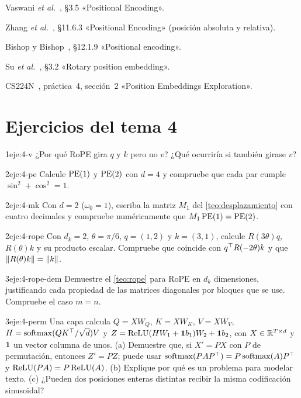 \begin{lecturas}
\item Vaswani \emph{et al.}~\cite{vaswani}, §3.5 «Positional Encoding».
\item Zhang \emph{et al.}~\cite{d2l}, §11.6.3 «Positional Encoding» (posición absoluta y relativa).
\item Bishop y Bishop~\cite{bishopdl}, §12.1.9 «Positional encoding».
\item Su \emph{et al.}~\cite{roformer}, §3.2 «Rotary position embedding».
\item CS224N~\cite{cs224n}, práctica~4, sección~2 «Position Embeddings Exploration».
\end{lecturas}

\section*{Ejercicios del tema 4}

\begin{ejercicio}{1}{eje:4-v}
¿Por qué RoPE gira $q$ y $k$ pero no $v$? ¿Qué ocurriría si también girase $v$?
\end{ejercicio}

\begin{ejercicio}{2}{eje:4-pe}
Calcule $\operatorname{PE}(1)$ y $\operatorname{PE}(2)$ con $d=4$ y compruebe que cada par cumple $\sin^{2}+\cos^{2}=1$.
\end{ejercicio}

\begin{ejercicio}{2}{eje:4-mk}
Con $d=2$ ($\omega_0=1$), escriba la matriz $M_1$ del \cref{teo:desplazamiento} con cuatro decimales y compruebe numéricamente que $M_1\operatorname{PE}(1)=\operatorname{PE}(2)$.
\end{ejercicio}

\begin{ejercicio}{2}{eje:4-rope}
Con $d_k=2$, $\theta=\pi/6$, $q=(1,2)$ y $k=(3,1)$, calcule $R(3\theta)q$, $R(\theta)k$ y su producto escalar. Compruebe que coincide con $q^{\top} R(-2\theta)k$ y que $\lVert R(\theta)k\rVert=\lVert k\rVert$.
\end{ejercicio}

\begin{ejercicio}{3}{eje:4-rope-dem}
Demuestre el \cref{teo:rope} para RoPE en $d_k$ dimensiones, justificando cada propiedad de las matrices diagonales por bloques que se use. Compruebe el caso $m=n$.
\end{ejercicio}

\begin{ejercicio}{3}{eje:4-perm}
Una capa calcula $Q=XW_Q$, $K=XW_K$, $V=XW_V$, $H=\operatorname{softmax}(QK^{\top}/\sqrt d)V$ y $Z=\operatorname{ReLU}(HW_1+\mathbf{1} b_1)W_2+\mathbf{1} b_2$, con $X\in\mathbb{R}^{T\times d}$ y $\mathbf{1}$ un vector columna de unos. (a) Demuestre que, si $X'=PX$ con $P$ de permutación, entonces $Z'=PZ$; puede usar $\operatorname{softmax}(PAP^{\top})=P\operatorname{softmax}(A)P^{\top}$ y $\operatorname{ReLU}(PA)=P\operatorname{ReLU}(A)$. (b) Explique por qué es un problema para modelar texto. (c) ¿Pueden dos posiciones enteras distintas recibir la misma codificación sinusoidal?
\end{ejercicio}

